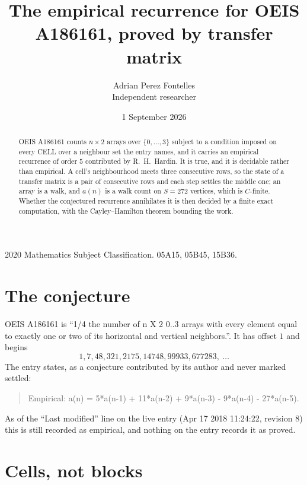 \documentclass[11pt,a4paper]{article}
\title{The empirical recurrence for OEIS A186161, proved by transfer matrix}
\author{Adrian Perez Fontelles\\ \small Independent researcher}
\date{1 September 2026}
\theoremstyle{plain}
\theoremstyle{definition}
\begin{document}
\maketitle

\begin{abstract}
OEIS A186161 counts $n\times2$ arrays over $\{0,\dots,3\}$ subject to a condition imposed on
every CELL over a neighbour set the entry names, and it carries an empirical recurrence of
order $5$ contributed by R.~H.~Hardin. It is true, and it is decidable rather than
empirical. A cell's neighbourhood meets three consecutive rows, so the state of a transfer
matrix is a pair of consecutive rows and each step settles the middle one; an array is a
walk, and $a(n)$ is a walk count on $S=272$ vertices, which is $C$-finite. Whether the
conjectured recurrence annihilates it is then decided by a finite exact computation, with the
Cayley--Hamilton theorem bounding the work.
\end{abstract}

\noindent\small 2020 Mathematics Subject Classification. 05A15, 05B45, 15B36.\normalsize

\section{The conjecture}

OEIS A186161 is ``1/4 the number of n X 2 0..3 arrays with every element equal to exactly one or two of its horizontal and vertical neighbors.''. It has offset $1$ and begins
\[
1, 7, 48, 321, 2175, 14748, 99933, 677283,\ \dots
\]
The entry states, as a conjecture contributed by its author and never marked settled:
\begin{quote}
Empirical: a(n) = 5*a(n-1) + 11*a(n-2) + 9*a(n-3) - 9*a(n-4) - 27*a(n-5).
\end{quote}
As of the ``Last modified'' line on the live entry (Apr 17 2018 11:24:22, revision 8) this is still
recorded as empirical, and nothing on the entry records it as proved.

\section{Cells, not blocks}
\end{document}
